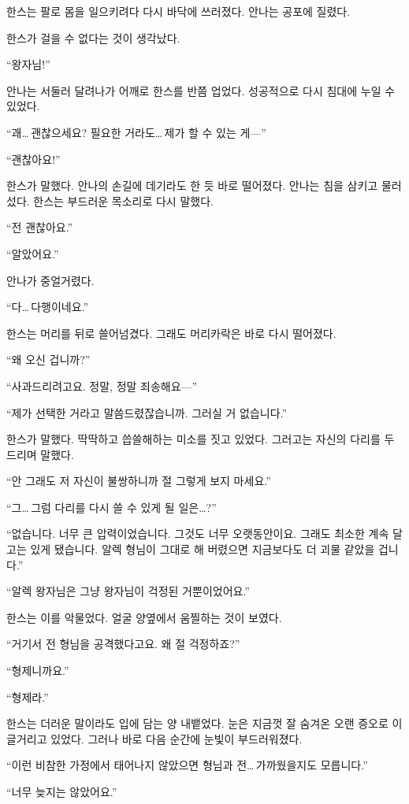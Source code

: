 한스는 팔로 몸을 일으키려다 다시 바닥에 쓰러졌다. 안나는 공포에 질렸다.

한스가 걸을 수 없다는 것이 생각났다.

``왕자님!''

안나는 서둘러 달려나가 어깨로 한스를 반쯤 업었다. 성공적으로 다시 침대에 누일 수 있었다.

``괘\ldots\,괜찮으세요? 필요한 거라도\ldots\,제가 할 수 있는 게—''

``괜찮아요!''

한스가 말했다. 안나의 손길에 데기라도 한 듯 바로 떨어졌다. 안나는 침을 삼키고 물러섰다. 한스는 부드러운 목소리로 다시 말했다.

``전 괜찮아요.''

``알았어요.''

안나가 중얼거렸다.

``다\ldots\,다행이네요.''

한스는 머리를 뒤로 쓸어넘겼다. 그래도 머리카락은 바로 다시 떨어졌다.

``왜 오신 겁니까?''

``사과드리려고요. 정말, 정말 죄송해요—''

``제가 선택한 거라고 말씀드렸잖습니까. 그러실 거 없습니다.''

한스가 말했다. 딱딱하고 씁쓸해하는 미소를 짓고 있었다. 그러고는 자신의 다리를 두드리며 말했다.

``안 그래도 저 자신이 불쌍하니까 절 그렇게 보지 마세요.''

``그\ldots\,그럼 다리를 다시 쓸 수 있게 될 일은\ldots?''

``없습니다. 너무 큰 압력이었습니다. 그것도 너무 오랫동안이요. 그래도 최소한 계속 달고는 있게 됐습니다. 알렉 형님이 그대로 해 버렸으면 지금보다도 더 괴물 같았을 겁니다.''

``알렉 왕자님은 그냥 왕자님이 걱정된 거뿐이었어요.''

한스는 이를 악물었다. 얼굴 양옆에서 움찔하는 것이 보였다.

``거기서 전 형님을 공격했다고요. 왜 절 걱정하죠?''

``형제니까요.''

``형제라.''

한스는 더러운 말이라도 입에 담는 양 내뱉었다. 눈은 지금껏 잘 숨겨온 오랜 증오로 이글거리고 있었다. 그러나 바로 다음 순간에 눈빛이 부드러워졌다.

``이런 비참한 가정에서 태어나지 않았으면 형님과 전\ldots\,가까웠을지도 모릅니다.''

``너무 늦지는 않았어요.''

